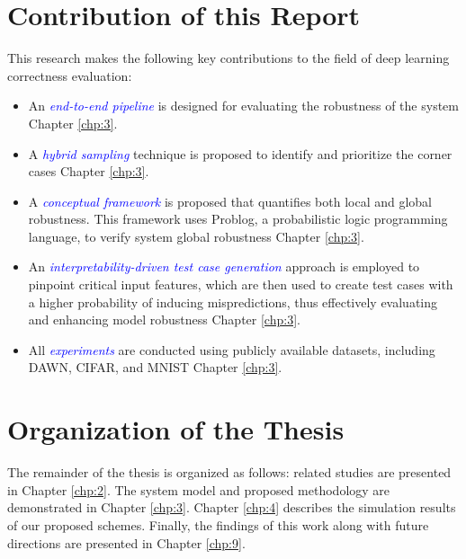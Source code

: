 \section{Contribution of this Report}

This research makes the following key contributions to the field of deep learning correctness evaluation:

\begin{itemize}
    \item An \textit{\textcolor{blue}{end-to-end pipeline}} is designed for evaluating the robustness of the system Chapter \ref{chp:3}.
    \item A \textit{\textcolor{blue}{hybrid sampling}} technique is proposed to identify and prioritize the corner cases Chapter \ref{chp:3}.
    \item A \textit{\textcolor{blue}{conceptual framework}} is proposed that quantifies both local and global robustness. This framework uses Problog, a probabilistic logic programming language, to verify system global robustness Chapter \ref{chp:3}. 
    \item An \textit{\textcolor{blue}{interpretability-driven test case generation}} approach is employed to pinpoint critical input features, which are then used to create test cases with a higher probability of inducing mispredictions, thus effectively evaluating and enhancing model robustness Chapter \ref{chp:3}.
    \item All \textit{\textcolor{blue}{experiments}} are conducted using publicly available datasets, including DAWN, CIFAR, and MNIST Chapter \ref{chp:3}.
\end{itemize}

\begin{center}
    \end{center}
\section{Organization of the Thesis}\hypertarget{organization of thesis}{}
The remainder of the thesis is organized as follows: related studies are presented in Chapter \ref{chp:2}. The system model and proposed methodology are demonstrated in Chapter \ref{chp:3}. Chapter \ref{chp:4} describes the simulation results of our proposed schemes. Finally, the findings of this work along with future directions are presented in Chapter \ref{chp:9}.




\clearpage
